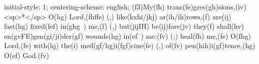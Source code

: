 initial-style: 1;
centering-scheme: english;
(f3)My(fh) trans(fe)gres(gh)sions,(iv) <sp>*</sp> O(hg) Lord,(fhffe) (,) like(kxhi/jkj) ar(ih/ih)rows,(f) are(ij) fast(hg) fixed(fef) in(ghg~) me,(f) (,) but(jijIH) be(ij)fore(jv) they(f) shall(hv) en(gvFE)gen(gi/ji)der(gf) wounds(hg) in(ef~) me:(fv) (;) heal(fh) me,(fe) O(fhg) Lord,(fe) with(hj) the(i) med(gf/hg)i(fgf)cine(fe) (,) of(fv) pen(hih)i(gf)tence,(hg) O(ef) God.(fv)
